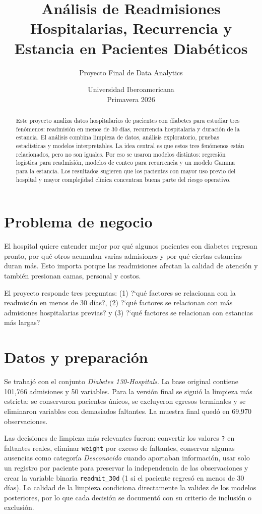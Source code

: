 \documentclass[11pt]{article}
\title{\textbf{Análisis de Readmisiones Hospitalarias, Recurrencia y Estancia en Pacientes Diabéticos}}
\author{Proyecto Final de Data Analytics}
\date{Universidad Iberoamericana \\ Primavera 2026}
\begin{document}
\maketitle

\begin{abstract}
Este proyecto analiza datos hospitalarios de pacientes con diabetes para estudiar tres fenómenos: readmisión en menos de 30 días, recurrencia hospitalaria y duración de la estancia. El análisis combina limpieza de datos, análisis exploratorio, pruebas estadísticas y modelos interpretables. La idea central es que estos tres fenómenos están relacionados, pero no son iguales. Por eso se usaron modelos distintos: regresión logística para readmisión, modelos de conteo para recurrencia y un modelo Gamma para la estancia. Los resultados sugieren que los pacientes con mayor uso previo del hospital y mayor complejidad clínica concentran buena parte del riesgo operativo.
\end{abstract}

\section{Problema de negocio}

El hospital quiere entender mejor por qué algunos pacientes con diabetes regresan pronto, por qué otros acumulan varias admisiones y por qué ciertas estancias duran más. Esto importa porque las readmisiones afectan la calidad de atención y también presionan camas, personal y costos.

El proyecto responde tres preguntas: (1) ?`qué factores se relacionan con la readmisión en menos de 30 días?, (2) ?`qué factores se relacionan con más admisiones hospitalarias previas? y (3) ?`qué factores se relacionan con estancias más largas?

\section{Datos y preparación}

Se trabajó con el conjunto \textit{Diabetes 130-Hospitals}. La base original contiene 101,766 admisiones y 50 variables. Para la versión final se siguió la limpieza más estricta: se conservaron pacientes únicos, se excluyeron egresos terminales y se eliminaron variables con demasiados faltantes. La muestra final quedó en 69,970 observaciones.

Las decisiones de limpieza más relevantes fueron: convertir los valores \texttt{?} en faltantes reales, eliminar \texttt{weight} por exceso de faltantes, conservar algunas ausencias como categoría \textit{Desconocido} cuando aportaban información, usar solo un registro por paciente para preservar la independencia de las observaciones y crear la variable binaria \texttt{readmit\_30d} (1 si el paciente regresó en menos de 30 días). La calidad de la limpieza condiciona directamente la validez de los modelos posteriores, por lo que cada decisión se documentó con su criterio de inclusión o exclusión.
\end{document}
